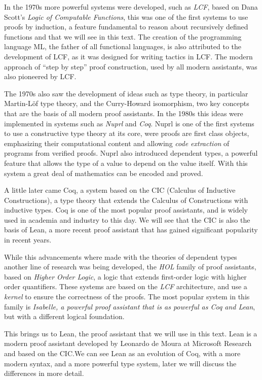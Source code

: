 \documentclass[
  a4paper, 
  10pt, 
  parskip=half, 
  DIV=20,
  toc=bibliography,
  usegeometry,
]{scrartcl}
\begin{document}
In the 1970s more powerful systems were developed, such as \emph{LCF}, based on
Dana Scott's \emph{Logic of Computable Functions}, this was one of the first systems
to use proofs by induction, a feature fundamental to reason about recursively
defined functions and that we will see in this text. The creation of the
programming language ML, the father of all functional languages, is also
attributed to the development of LCF, as it was designed for writing tactics
in LCF. The modern approach of \enquote{step by step} proof construction, used by all
modern assistants, was also pioneered by LCF.\@

The 1970s also saw the development of ideas such as type theory, in particular
Martin-Löf type theory, and the Curry-Howard isomorphism, two key concepts that
are the basis of all modern proof assistants. In the 1980s this ideas were
implemented in systems such as \emph{Nuprl} and \emph{Coq}. Nuprl is one of the
first systems to use a constructive type theory at its core, were proofs are
first class objects, emphasizing their computational content and allowing
\emph{code extraction} of programs from verified proofs. Nuprl also introduced
dependent types, a powerful feature that allows the type of a value to depend on
the value itself. With this system a great deal of mathematics can be encoded
and proved.

A little later came Coq, a system based on the CIC (Calculus of Inductive
Constructions), a type theory that extends the Calculus of Constructions with
inductive types. Coq is one of the most popular proof assistants, and is widely
used in academia and industry to this day. We will see that the CIC is also the
basis of Lean, a more recent proof assistant that has gained significant
popularity in recent years.

While this advancements where made with the theories of dependent types another
line of research was being developed, the \emph{HOL} family of proof assistants,
based on \emph{Higher Order Logic}, a logic that extends first-order logic with
higher order quantifiers. These systems are based on the \emph{LCF} architecture, and
use a \emph{kernel} to ensure the correctness of the proofs. The most popular system
in this family is \emph{Isabelle, a powerful proof assistant that is as
powerful as Coq and Lean}, but with a different logical foundation.

This brings us to Lean, the proof assistant that we will use in this text. Lean
is a modern proof assistant developed by Leonardo de Moura at Microsoft Research
and based on the CIC.\@ We can see Lean as an evolution of Coq, with a more modern
syntax, and a more powerful type system, later we will discuss the differences
in more detail.
\end{document}
